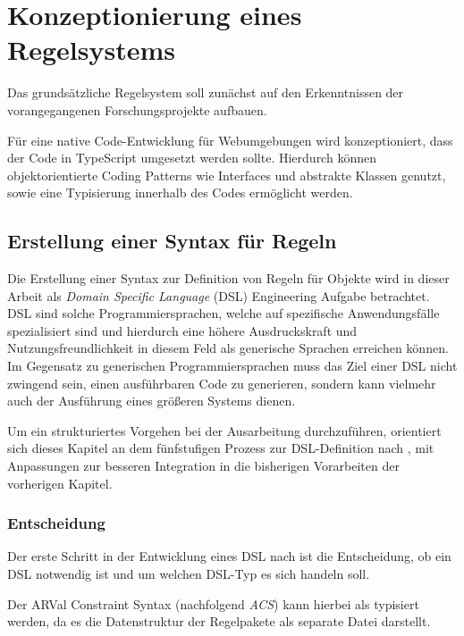 \section{Konzeptionierung eines Regelsystems}\label{section:Konzeptualisierung eines Constraint-Systems}

Das grundsätzliche Regelsystem soll zunächst auf den Erkenntnissen der vorangegangenen Forschungsprojekte aufbauen. 

Für eine native Code-Entwicklung für Webumgebungen wird konzeptioniert, dass der Code in TypeScript umgesetzt werden sollte. Hierdurch können objektorientierte Coding Patterns wie Interfaces und abstrakte Klassen genutzt, sowie eine Typisierung innerhalb des Codes ermöglicht werden. 

\subsection{Erstellung einer Syntax für Regeln}

Die Erstellung einer Syntax zur Definition von Regeln für Objekte wird in dieser Arbeit als \textit{Domain Specific Language} (DSL) Engineering Aufgabe betrachtet. DSL sind solche Programmiersprachen, welche auf spezifische Anwendungsfälle spezialisiert sind und hierdurch eine höhere Ausdruckskraft und Nutzungsfreundlichkeit in diesem Feld als generische Sprachen erreichen können. Im Gegensatz zu generischen Programmiersprachen muss das Ziel einer DSL nicht zwingend sein, einen ausführbaren Code zu generieren, sondern kann vielmehr auch der Ausführung eines größeren Systems dienen. \parencite[S. 316f]{mernikWhenHowDevelop2005}

Um ein strukturiertes Vorgehen bei der Ausarbeitung durchzuführen, orientiert sich dieses Kapitel an dem fünfstufigen Prozess zur DSL-Definition nach \textcite{mernikWhenHowDevelop2005}, mit Anpassungen zur besseren Integration in die bisherigen Vorarbeiten der vorherigen Kapitel.

\subsubsection{Entscheidung}

Der erste Schritt in der Entwicklung eines DSL nach \textcite{mernikWhenHowDevelop2005} ist die Entscheidung, ob ein DSL notwendig ist und um welchen DSL-Typ es sich handeln soll.

Der ARVal Constraint Syntax (nachfolgend \textit{ACS}) kann hierbei als  typisiert werden, da es die Datenstruktur der Regelpakete als separate Datei darstellt.

